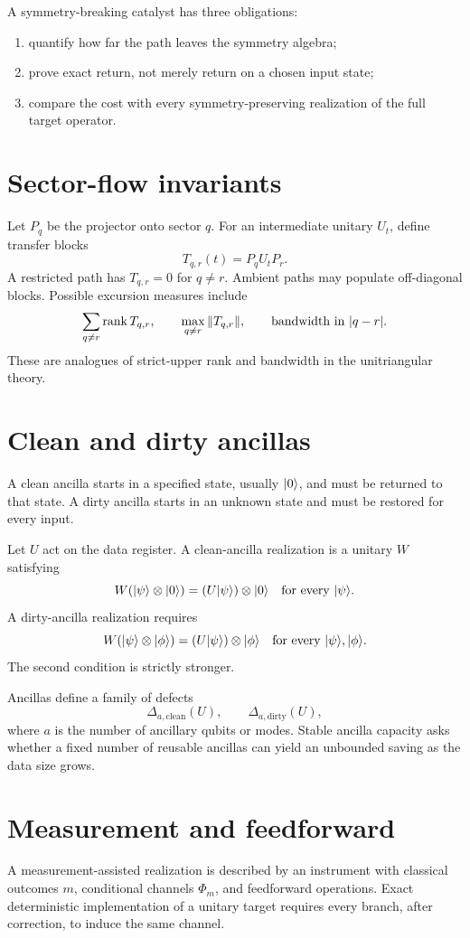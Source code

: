 \begin{skeletonbox}
A symmetry-breaking catalyst has three obligations:
\begin{enumerate}
\item quantify how far the path leaves the symmetry algebra;
\item prove exact return, not merely return on a chosen input state;
\item compare the cost with every symmetry-preserving realization of the full target operator.
\end{enumerate}
\end{skeletonbox}

\section{Sector-flow invariants}
Let $P_q$ be the projector onto sector $q$.  For an intermediate unitary $U_t$, define transfer blocks
\[
T_{q,r}(t)=P_q U_t P_r.
\]
A restricted path has $T_{q,r}=0$ for $q\ne r$.  Ambient paths may populate off-diagonal blocks.  Possible excursion measures include
\[
\sum_{q\ne r}\operatorname{rank} T_{q,r},
\qquad
\max_{q\ne r}\|T_{q,r}\|,
\qquad
\text{bandwidth in }|q-r|.
\]
These are analogues of strict-upper rank and bandwidth in the unitriangular theory.

\section{Clean and dirty ancillas}
A clean ancilla starts in a specified state, usually $\lvert 0\rangle$, and must be returned to that state.  A dirty ancilla starts in an unknown state and must be restored for every input.

Let $U$ act on the data register.  A clean-ancilla realization is a unitary $W$ satisfying
\[
W(\lvert \psi\rangle\otimes\lvert 0\rangle)
=(U\lvert \psi\rangle)\otimes\lvert 0\rangle
\quad\text{for every }\lvert \psi\rangle.
\]
A dirty-ancilla realization requires
\[
W(\lvert \psi\rangle\otimes\lvert \phi\rangle)
=(U\lvert \psi\rangle)\otimes\lvert \phi\rangle
\quad\text{for every }\lvert \psi\rangle,\lvert \phi\rangle.
\]
The second condition is strictly stronger.

Ancillas define a family of defects
\[
\Delta_{a,\mathrm{clean}}(U),
\qquad
\Delta_{a,\mathrm{dirty}}(U),
\]
where $a$ is the number of ancillary qubits or modes.  Stable ancilla capacity asks whether a fixed number of reusable ancillas can yield an unbounded saving as the data size grows.

\section{Measurement and feedforward}
A measurement-assisted realization is described by an instrument with classical outcomes $m$, conditional channels $\Phi_m$, and feedforward operations.  Exact deterministic implementation of a unitary target requires every branch, after correction, to induce the same channel.

